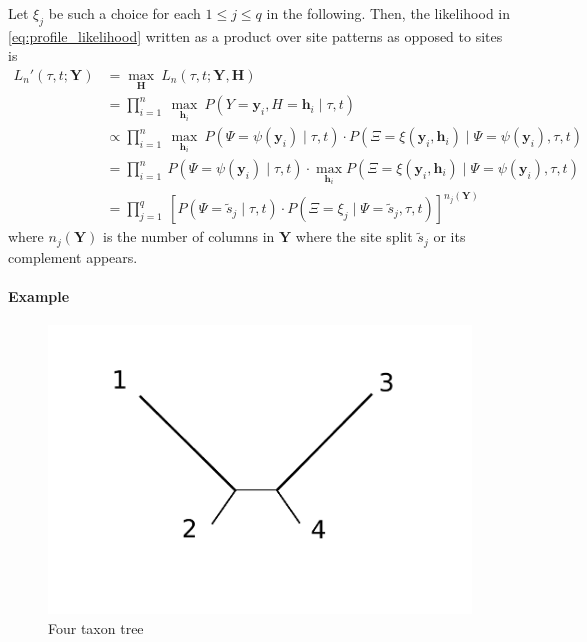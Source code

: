\documentclass{article}
\newcommand{\fullAlignment}{\mathbf{Y}}
\newcommand{\alignmentColumn}{\mathbf{y}}
\newcommand{\alignmentColumnRV}{Y}
\newcommand{\siteSplit}{\tilde{s}}
\newcommand{\fullAncestralStates}{\mathbf{H}}
\newcommand{\ancestralStateColumn}{\mathbf{h}}
\newcommand{\ancestralStateColumnRV}{H}
\newcommand{\patternToSplit}{\psi}
\newcommand{\ancestralToSplit}{\xi}
\newcommand{\siteSplitRV}{\Psi}
\newcommand{\ancestralSplitRV}{\Xi}
\newcommand{\nCols}{n}
\newcommand{\nSiteSplits}{q}
\begin{document}
Let $\xi_j$ be such a choice for each $1 \leq j \leq q$ in the following.
Then, the likelihood in \eqref{eq:profile_likelihood} written as a product over site patterns as opposed to sites is
\begin{align}
L_\nCols'(\tau, t; \fullAlignment) &= \max_{\fullAncestralStates} \ L_\nCols(\tau, t; \fullAlignment, \fullAncestralStates) \nonumber \\
                             &= \prod_{i=1}^{\nCols} \ \max_{\ancestralStateColumn_i} \ P(\alignmentColumnRV=\alignmentColumn_i, \ancestralStateColumnRV=\ancestralStateColumn_i \mid \tau, t) \nonumber \\
                             &\propto \prod_{i=1}^{\nCols} \ \max_{\ancestralStateColumn_i} \ P(\siteSplitRV=\patternToSplit(\alignmentColumn_i) \mid \tau, t) \cdot P(\ancestralSplitRV=\ancestralToSplit(\alignmentColumn_i, \ancestralStateColumn_i) \mid \siteSplitRV=\patternToSplit(\alignmentColumn_i), \tau, t) \nonumber \\
                             &= \prod_{i=1}^{\nCols} \ P(\siteSplitRV=\patternToSplit(\alignmentColumn_i) \mid \tau, t) \cdot \max_{\ancestralStateColumn_i} P(\ancestralSplitRV=\ancestralToSplit(\alignmentColumn_i, \ancestralStateColumn_i) \mid \siteSplitRV=\patternToSplit(\alignmentColumn_i), \tau, t) \nonumber \\
                             &= \prod_{j=1}^{\nSiteSplits} \ \left[P(\siteSplitRV=\siteSplit_j \mid \tau, t)\cdot P(\ancestralSplitRV=\xi_j \mid \siteSplitRV=\siteSplit_j, \tau, t)\right] ^{\nCols_j(\fullAlignment)} \label{eq:site_pattern_likelihood}
\end{align}
where $\nCols_j(\fullAlignment)$ is the number of columns in $\fullAlignment$ where the site split $\siteSplit_j$ or its complement appears.

\paragraph{Example}
\begin{figure}
    \centering
    \includegraphics[width=.45\textwidth]{unrooted_four_taxa}
    \caption{Four taxon tree}
\label{fig:four-taxa-tree}
\end{figure}
\end{document}
